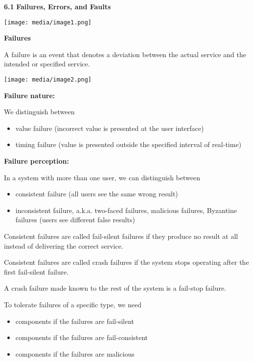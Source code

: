 \textbf{6.1} \protect\hypertarget{teil2}{}{}\textbf{Failures, Errors,
and Faults}

\texttt{[image: media/image1.png]}

\textbf{Failures}

A failure is an event that denotes a deviation between the actual
service and the intended or specified service.

\texttt{[image: media/image2.png]}

\textbf{Failure nature:}

We distinguish between

\begin{itemize}
\item
  value failure (incorrect value is presented at the user interface)
\item
  timing failure (value is presented outside the specified interval of
  real-time)
\end{itemize}

\textbf{Failure perception:}

In a system with more than one user, we can distinguish between

\begin{itemize}
\item
  consistent failure (all users see the same wrong result)
\item
  inconsistent failure, a.k.a. two-faced failures, malicious failures,
  Byzantine failures (users see different false results)
\end{itemize}

Consistent failures are called fail-silent failures if they produce no
result at all instead of delivering the correct service.

Consistent failures are called crash failures if the system stops
operating after the first fail-silent failure.

A crash failure made known to the rest of the system is a fail-stop
failure.

To tolerate failures of a specific type, we need

\begin{itemize}
\item
  components if the failures are fail-silent
\item
  components if the failures are fail-consistent
\item
  components if the failures are malicious
\end{itemize}

